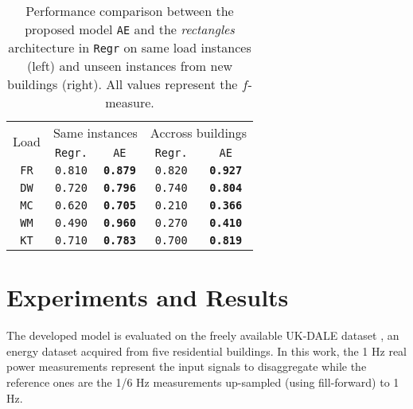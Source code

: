 \documentclass[twocolumn,letter,10pt]{IEEEtran} %
\begin{document}
\begin{table}[!t]
	\begin{center}
		\caption{Performance comparison between the proposed model \texttt{AE} and the \emph{rectangles} architecture in \cite{Kelly_2015} \texttt{Regr} on same load instances (left) and unseen instances from new buildings (right). All values represent the $f$-measure.}
		\label{tbl:across-loads}
		\setlength\intextsep{0mm}
		\setlength{\tabcolsep}{10pt}
		\footnotesize
		\newcommand{\fscore}{\texttt{f}$_\texttt{1}$\texttt{-s}}
		\newcommand{\wrst}[1]{\texttt{#1}}
		\newcommand{\best}[1]{\textbf{\texttt{#1}}}
		\begin{tabularx}{0.94\columnwidth}{c|cc|cc}
			\toprule					
			\multirow{2}{*}{Load}	&				\multicolumn{2}{c}{Same instances} 					&		\multicolumn{2}{c}{Accross buildings} 				\\
			\cmidrule(lr){2-3}
			\cmidrule(lr){4-5}
			&	\texttt{Regr.} \cite{Kelly_2015}	&		\texttt{AE}		&		\texttt{Regr.} \cite{Kelly_2015}		& \texttt{AE}	\\
			\midrule
			\texttt{FR}				&		\wrst{0.810} 					&		\best{0.879}		&			\wrst{0.820} 					& \best{0.927}	\\
			\texttt{DW}				&		\wrst{0.720} 					&		\best{0.796}		&			\wrst{0.740} 					& \best{0.804}	\\
			\texttt{MC}				&		\wrst{0.620} 					&		\best{0.705}		&			\wrst{0.210} 					& \best{0.366}	\\
			\texttt{WM}				&		\wrst{0.490} 					&		\best{0.960}		&			\wrst{0.270} 					& \best{0.410}	\\
			\texttt{KT}				&		\wrst{0.710} 					&		\best{0.783}		&			\wrst{0.700} 					& \best{0.819}	\\
			\bottomrule
		\end{tabularx}
	\end{center}
\end{table}


\section{Experiments and Results}
\label{sec:experiments-and-results}

The developed model is evaluated on the freely available UK-DALE dataset \cite{Kelly_2015_UKDALE}, an energy dataset acquired from five residential buildings.
In this work, the 1 Hz real power measurements represent the input signals to disaggregate while the reference ones are the 1/6 Hz measurements up-sampled (using fill-forward) to 1 Hz.
\end{document}
